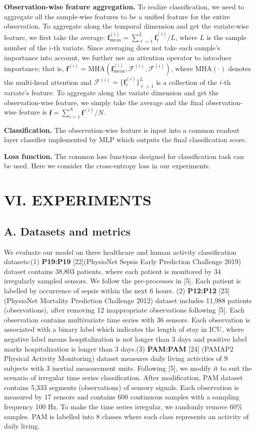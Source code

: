 \documentclass[twocolumn]{article}
\begin{document}
\textbf{Observation-wise feature aggregation.} To realize classification, we need to aggregate all the sample-wise features to be a unified feature for the entire observation. To aggregate along the temporal dimension and get the variate-wise feature, we first take the average: $\mathbf{f}_{\text{mean}}^{(i)} = \sum_{\ell=1}^L \mathbf{f}_\ell^{(i)} / L$, where $L$ is the sample number of the $i$-th variate. Since averaging does not take each sample's importance into account, we further use an attention operator to introduce importance; that is, $\mathbf{f}^{(i)} = \text{MHA}(\mathbf{f}_{\text{mean}}^{(i)}, \mathcal{F}^{(i)}, \mathcal{F}^{(i)})$, where $\text{MHA}(\cdot)$ denotes the multi-head attention and $\mathcal{F}^{(i)} = \{\mathbf{f}_\ell^{(i)}\}_{\ell=1}^L$ is a collection of the $i$-th variate's feature. To aggregate along the variate dimension and get the observation-wise feature, we simply take the average and the final observation-wise feature is $\mathbf{f} = \sum_{i=1}^N \mathbf{f}^{(i)} / N$.

\textbf{Classification.} The observation-wise feature is input into a common readout layer classifier implemented by MLP which outputs the final classification score.

\textbf{Loss function.} The common loss functions designed for classification task can be used. Here we consider the cross-entropy loss in our experiments.

\section{VI. EXPERIMENTS}
\subsection{A. Datasets and metrics}
We evaluate our model on three healthcare and human activity classification datasets:(1) \textbf{P19:P19} [22](PhysioNet Sepsis Early Prediction Challenge 2019) dataset contains 38,803 patients, where each patient is monitored by 34 irregularly sampled sensors. We follow the pre-processes in [5]. Each patient is labelled by occurrence of sepsis within the next 6 hours. (2) \textbf{P12:P12} [23](PhysioNet Mortality Prediction Challenge 2012) dataset includes 11,988 patients (observations), after removing 12 inappropriate observations following [5]. Each observation contains multivariate time series with 36 sensors. Each observation is associated with a binary label which indicates the length of stay in ICU, where negative label means hospitalization is not longer than 3 days and positive label marks hospitalization is longer than 3 days.(3) \textbf{PAM:PAM} [24] (PAMAP2 Physical Activity Monitoring) dataset measures daily living activities of 9 subjects with 3 inertial measurement units. Following [5], we modify it to suit the scenario of irregular time series classification. After modification, PAM dataset contains 5,333 segments (observations) of sensory signals. Each observation is measured by 17 sensors and contains 600 continuous samples with a sampling frequency 100 Hz. To make the time series irregular, we randomly remove 60\% samples. PAM is labelled into 8 classes where each class represents an activity of daily living.
\end{document}
